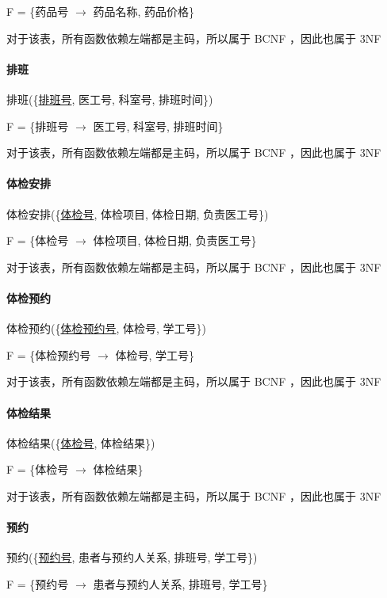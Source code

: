 \documentclass{article}
\begin{document}
F = \{药品号 $\rightarrow$ 药品名称, 药品价格\}

对于该表，所有函数依赖左端都是主码，所以属于 BCNF ，因此也属于 3NF

\paragraph{排班}

排班(\{\underline{排班号}, 医工号, 科室号, 排班时间\})

F = \{排班号 $\rightarrow$ 医工号, 科室号, 排班时间\}

对于该表，所有函数依赖左端都是主码，所以属于 BCNF ，因此也属于 3NF

\paragraph{体检安排}

体检安排(\{\underline{体检号}, 体检项目, 体检日期, 负责医工号\})

F = \{体检号 $\rightarrow$ 体检项目, 体检日期, 负责医工号\}

对于该表，所有函数依赖左端都是主码，所以属于 BCNF ，因此也属于 3NF

\paragraph{体检预约}

体检预约(\{\underline{体检预约号}, 体检号, 学工号\})

F = \{体检预约号 $\rightarrow$ 体检号, 学工号\}

对于该表，所有函数依赖左端都是主码，所以属于 BCNF ，因此也属于 3NF

\paragraph{体检结果}

体检结果(\{\underline{体检号}, 体检结果\})

F = \{体检号 $\rightarrow$ 体检结果\}

对于该表，所有函数依赖左端都是主码，所以属于 BCNF ，因此也属于 3NF

\paragraph{预约}

预约(\{\underline{预约号}, 患者与预约人关系, 排班号, 学工号\})

F = \{预约号 $\rightarrow$ 患者与预约人关系, 排班号, 学工号\}
\end{document}
